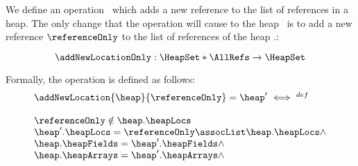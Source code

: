 




 We define an operation \addNewLocationOnly \  which adds a new reference to the list of references in a heap.
 The only change that the operation will cause to the heap \heap \ is to add
 a new reference $\referenceOnly$ to the list of references of the heap \heap.\heapLocs:   

 $$ \addNewLocationOnly : \HeapSet *  \AllRefs   \rightarrow \HeapSet $$

 Formally, the operation is defined as follows: 
 $$ \begin{array}{l}
           \addNewLocation{\heap}{\referenceOnly} = \heap' \iff^{def} \\
	      \\
   	      \referenceOnly \notin \heap.\heapLocs   \\ 
	      \heap'.\heapLocs = \referenceOnly \assocList \heap.\heapLocs \wedge \\ 
	      \heap.\heapFields = \heap'.\heapFields \wedge \\
	      \heap.\heapArrays = \heap'.\heapArrays \wedge \\
    \end{array}$$ 

